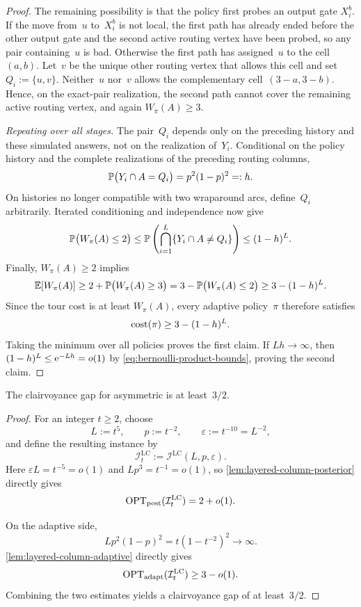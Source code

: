 \documentclass[12pt,a4paper,oneside]{report}
\begin{document}
\begin{proof}
The remaining possibility is that the policy first probes an output gate
$X_i^b$.  If the move from~$u$ to~$X_i^b$ is not local, the first path has
already ended before the other output gate and the second active routing vertex
have been probed, so any pair containing~$u$ is bad.  Otherwise the first
path has assigned~$u$ to the cell~$(a,b)$.  Let~$v$ be the unique other
routing vertex that allows this cell and set $Q_i:=\{u,v\}$.  Neither~$u$ nor~$v$
allows the complementary cell~$(3-a,3-b)$.  Hence, on the exact-pair
realization, the second path cannot cover the remaining active routing vertex, and
again $W_\pi(A)\ge3$.

\medskip
\noindent\emph{Repeating over all stages.}
The pair~$Q_i$ depends only on the preceding history and these simulated
answers, not on the realization of~$Y_i$.  Conditional on the policy history
and the complete realizations of the preceding routing columns,
\[
    \P\bigl(Y_i\cap A=Q_i\bigr)=p^2(1-p)^2=:h.
\]
On histories no longer
compatible with two wraparound arcs, define~$Q_i$ arbitrarily.  Iterated
conditioning and independence now give
\[
    \P\bigl(W_\pi(A)\le2\bigr)
    \le
    \P\left(\bigcap_{i=1}^L\{Y_i\cap A\ne Q_i\}\right)
    \le(1-h)^L.
\]
Finally, $W_\pi(A)\ge2$ implies
\[
    \E[W_\pi(A)]
    \ge2+\P\bigl(W_\pi(A)\ge3\bigr)
    =3-\P\bigl(W_\pi(A)\le2\bigr)
    \ge3-(1-h)^L.
\]
Since the tour cost is at least $W_\pi(A)$, every adaptive policy~$\pi$
therefore satisfies
\[
    \cost(\pi)\ge3-(1-h)^L.
\]
Taking the minimum over all policies proves the first claim.  If
$Lh\to\infty$, then $(1-h)^L\le\e^{-Lh}=o(1)$ by
\cref{eq:bernoulli-product-bounds}, proving the second claim.
\end{proof}

\begin{theorem}
\label{thm:layered-column-gap}
The clairvoyance gap for asymmetric \StochTSP{} is at least~$3/2$.
\end{theorem}

\begin{proof}
For an integer $t\ge2$, choose
\[
    L:=t^5,
    \qquad
    p:=t^{-2},
    \qquad
    \varepsilon:=t^{-10}=L^{-2},
\]
and define the resulting instance by
\[
    \mathcal{I}_t^{\mathrm{LC}}
    :=\mathcal{I}^{\mathrm{LC}}(L,p,\varepsilon).
\]
Here $\varepsilon L=t^{-5}=o(1)$ and $Lp^3=t^{-1}=o(1)$, so
\cref{lem:layered-column-posterior} directly gives
\[
    \optpost(\mathcal{I}_t^{\mathrm{LC}})=2+o(1).
\]

On the adaptive side,
\[
    Lp^2(1-p)^2
    =t(1-t^{-2})^2
    \longrightarrow\infty.
\]
\cref{lem:layered-column-adaptive} directly gives
\[
    \optadapt(\mathcal{I}_t^{\mathrm{LC}})\ge3-o(1).
\]
Combining the two estimates yields a clairvoyance gap of at least~$3/2$.
\end{proof}
\end{document}
